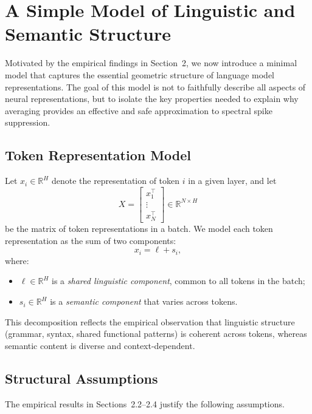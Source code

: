 \section{A Simple Model of Linguistic and Semantic Structure}
\label{sec:model}

Motivated by the empirical findings in Section~2, we now introduce a minimal
model that captures the essential geometric structure of language model
representations.
The goal of this model is not to faithfully describe all aspects of neural
representations, but to isolate the key properties needed to explain why
averaging provides an effective and safe approximation to spectral spike
suppression.

\subsection{Token Representation Model}

Let $x_i \in \mathbb{R}^H$ denote the representation of token $i$ in a given
layer, and let
\[
X = \begin{bmatrix} x_1^\top \\ \vdots \\ x_N^\top \end{bmatrix} \in \mathbb{R}^{N \times H}
\]
be the matrix of token representations in a batch.
We model each token representation as the sum of two components:
\begin{equation}
\label{eq:model_decomposition}
x_i = \ell + s_i,
\end{equation}
where:
\begin{itemize}
  \item $\ell \in \mathbb{R}^H$ is a \emph{shared linguistic component}, common to
  all tokens in the batch;
  \item $s_i \in \mathbb{R}^H$ is a \emph{semantic component} that varies across
  tokens.
\end{itemize}

This decomposition reflects the empirical observation that linguistic structure
(grammar, syntax, shared functional patterns) is coherent across tokens, whereas
semantic content is diverse and context-dependent.

\subsection{Structural Assumptions}

The empirical results in Sections~2.2--2.4 justify the following assumptions.

